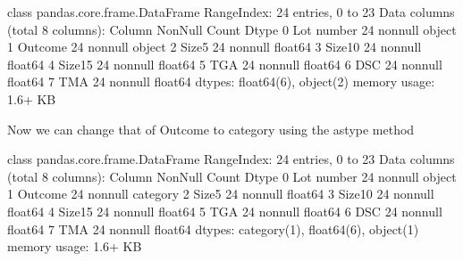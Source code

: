 \documentclass[letterpaper,10pt,english]{jupyterBook}
\begin{document}
\begin{sphinxVerbatim}[commandchars=\\\{\}]
\PYGZlt{}class \PYGZsq{}pandas.core.frame.DataFrame\PYGZsq{}\PYGZgt{}
RangeIndex: 24 entries, 0 to 23
Data columns (total 8 columns):
 \PYGZsh{}   Column      Non\PYGZhy{}Null Count  Dtype  
\PYGZhy{}\PYGZhy{}\PYGZhy{}  \PYGZhy{}\PYGZhy{}\PYGZhy{}\PYGZhy{}\PYGZhy{}\PYGZhy{}      \PYGZhy{}\PYGZhy{}\PYGZhy{}\PYGZhy{}\PYGZhy{}\PYGZhy{}\PYGZhy{}\PYGZhy{}\PYGZhy{}\PYGZhy{}\PYGZhy{}\PYGZhy{}\PYGZhy{}\PYGZhy{}  \PYGZhy{}\PYGZhy{}\PYGZhy{}\PYGZhy{}\PYGZhy{}  
 0   Lot number  24 non\PYGZhy{}null     object 
 1   Outcome     24 non\PYGZhy{}null     object 
 2   Size5       24 non\PYGZhy{}null     float64
 3   Size10      24 non\PYGZhy{}null     float64
 4   Size15      24 non\PYGZhy{}null     float64
 5   TGA         24 non\PYGZhy{}null     float64
 6   DSC         24 non\PYGZhy{}null     float64
 7   TMA         24 non\PYGZhy{}null     float64
dtypes: float64(6), object(2)
memory usage: 1.6+ KB
\end{sphinxVerbatim}

\sphinxAtStartPar
Now we can change that of Outcome to category using the astype method

\begin{sphinxVerbatim}[commandchars=\\\{\}]
  
\end{sphinxVerbatim}

\begin{sphinxVerbatim}[commandchars=\\\{\}]
\PYGZlt{}class \PYGZsq{}pandas.core.frame.DataFrame\PYGZsq{}\PYGZgt{}
RangeIndex: 24 entries, 0 to 23
Data columns (total 8 columns):
 \PYGZsh{}   Column      Non\PYGZhy{}Null Count  Dtype   
\PYGZhy{}\PYGZhy{}\PYGZhy{}  \PYGZhy{}\PYGZhy{}\PYGZhy{}\PYGZhy{}\PYGZhy{}\PYGZhy{}      \PYGZhy{}\PYGZhy{}\PYGZhy{}\PYGZhy{}\PYGZhy{}\PYGZhy{}\PYGZhy{}\PYGZhy{}\PYGZhy{}\PYGZhy{}\PYGZhy{}\PYGZhy{}\PYGZhy{}\PYGZhy{}  \PYGZhy{}\PYGZhy{}\PYGZhy{}\PYGZhy{}\PYGZhy{}   
 0   Lot number  24 non\PYGZhy{}null     object  
 1   Outcome     24 non\PYGZhy{}null     category
 2   Size5       24 non\PYGZhy{}null     float64 
 3   Size10      24 non\PYGZhy{}null     float64 
 4   Size15      24 non\PYGZhy{}null     float64 
 5   TGA         24 non\PYGZhy{}null     float64 
 6   DSC         24 non\PYGZhy{}null     float64 
 7   TMA         24 non\PYGZhy{}null     float64 
dtypes: category(1), float64(6), object(1)
memory usage: 1.6+ KB
\end{sphinxVerbatim}
\end{document}
